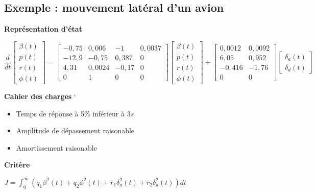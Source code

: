{{{\subsection{Exemple : mouvement latéral d'un avion}
\textbf{Représentation d'état}
\begin{center}
    \[
    \frac{d}{dt}
    \begin{bmatrix}
    \beta (t) \\
    p(t) \\
    r(t) \\
    \phi (t)    
    \end{bmatrix}
    =
    \begin{bmatrix}
        -0,75 & 0,006  & -1    & 0,0037 \\
        -12,9 & -0,75  & 0,387 & 0      \\
        4,31  & 0,0024 & -0,17 & 0      \\
        0     & 1      & 0     & 0
    \end{bmatrix}
    \begin{bmatrix}
        \beta (t) \\
        p(t) \\
        r(t) \\
        \phi (t)    
    \end{bmatrix}
    +
    \begin{bmatrix}
        0,0012 & 0,0092 \\
        6,05   & 0,952  \\
        -0,416 & -1,76  \\
        0      & 0 
    \end{bmatrix}
    \begin{bmatrix}
        \delta_{a}(t) \\
        \delta_{d}(t)
    \end{bmatrix}
    \]
\end{center}
\textbf{Cahier des charges}
`\begin{itemize}
    \item Temps de réponse à 5\% inférieur à $3s$
    \item Amplitude de dépassement raisonable
    \item Amortissement raisonable
\end{itemize}
\textbf{Critère}
\begin{center}
    \Large{$
    J = \int_{0}^{\infty}(q_{1}\beta^{2}(t) + q_{2}\phi^{2}(t) + r_{1}\delta_{a}^{2}(t) + r_{2}\delta_{d}^{2}(t)){dt}
    $}
\end{center}
}}}
